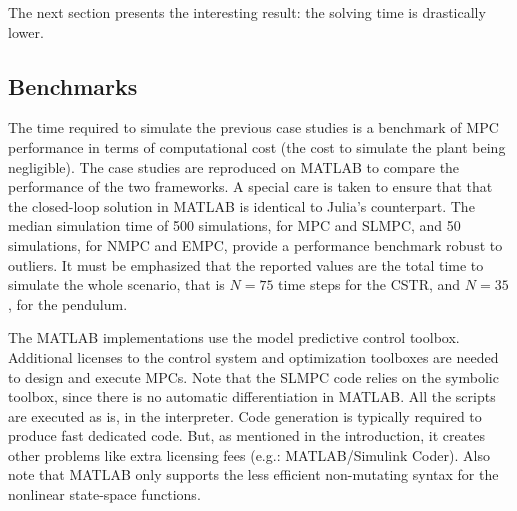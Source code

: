 The next section presents the interesting result: the solving time is drastically lower.

\subsection{Benchmarks}
\label{sec:benchmarks}

The time required to simulate the previous case studies is a benchmark of MPC performance in terms of computational cost (the cost to simulate the plant being negligible). The case studies are reproduced on MATLAB to compare the performance of the two frameworks. A special care is taken to ensure that that the closed-loop solution in MATLAB is identical to Julia’s counterpart. The median simulation time of 500 simulations, for MPC and SLMPC, and 50 simulations, for NMPC and EMPC, provide a performance benchmark robust to outliers. It must be emphasized that the reported values are the total time to simulate the whole scenario, that is $N=75$ time steps for the CSTR, and $N=35$, for the pendulum.

The MATLAB implementations use the model predictive control toolbox. Additional licenses to the control system and optimization toolboxes are needed to design and execute MPCs. Note that the SLMPC code relies on the symbolic toolbox, since there is no automatic differentiation in MATLAB. All the scripts are executed as is, in the interpreter. Code generation is typically required to produce fast dedicated code. But, as mentioned in the introduction, it creates other problems like extra licensing fees (e.g.: MATLAB/Simulink Coder). Also note that MATLAB only supports the less efficient non-mutating syntax for the nonlinear state-space functions.

